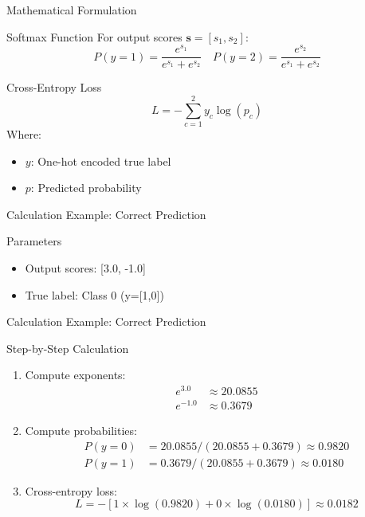 \documentclass{beamer}
\begin{document}
	\begin{frame}{Mathematical Formulation}
		\begin{block}{Softmax Function}
			For output scores $\mathbf{s} = [s_1, s_2]$:
			\[
			P(y=1) = \frac{e^{s_1}}{e^{s_1} + e^{s_2}} \quad P(y=2) = \frac{e^{s_2}}{e^{s_1} + e^{s_2}}
			\]
		\end{block}
		
		\begin{block}{Cross-Entropy Loss}
			\[
			L = -\sum_{c=1}^2 y_c \log(p_c)
			\]
			Where:
			\begin{itemize}
				\item $y$: One-hot encoded true label
				\item $p$: Predicted probability
			\end{itemize}
		\end{block}
	\end{frame}
	
	\begin{frame}{Calculation Example: Correct Prediction}
		\begin{block}{Parameters}
			\begin{itemize}
				\item Output scores: [3.0, -1.0]
				\item True label: Class 0 (y=[1,0])
			\end{itemize}
		\end{block}
	\end{frame}

\begin{frame}{Calculation Example: Correct Prediction}
		\begin{exampleblock}{Step-by-Step Calculation}
			\begin{enumerate}
				\item Compute exponents:
				\begin{align*}
					e^{3.0} &\approx 20.0855 \\
					e^{-1.0} &\approx 0.3679
				\end{align*}
				
				\item Compute probabilities:
				\begin{align*}
					P(y=0) &= {20.0855}/{(20.0855 + 0.3679)} \approx 0.9820 \\
					P(y=1) &= {0.3679}/{(20.0855 + 0.3679)} \approx 0.0180
				\end{align*}
				
				\item Cross-entropy loss:
				\[
				L = -[1\times\log(0.9820) + 0\times\log(0.0180)] \approx 0.0182
				\]
			\end{enumerate}
		\end{exampleblock}
	\end{frame}
	
\end{document}
